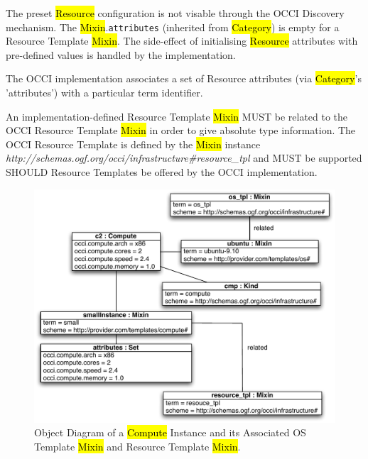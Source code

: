 \documentclass[10pt,a4paper]{article}
\begin{document}
The preset \hl{Resource} configuration is not visable through the OCCI
Discovery mechanism. The \hl{Mixin}.{\tt attributes} (inherited from
\hl{Category}) is empty for a Resource Template \hl{Mixin}.  The
side-effect of initialising \hl{Resource} attributes with pre-defined
values is handled by the implementation.

The OCCI implementation associates a set of Resource attributes (via
\hl{Category}'s 'attributes') with a particular term identifier.

An implementation-defined Resource Template \hl{Mixin} MUST be related
to the OCCI Resource Template \hl{Mixin} in order to give absolute
type information. The OCCI Resource Template is defined by the
\hl{Mixin} instance
\textit{http://schemas.ogf.org/occi/infrastructure\#resource\_tpl} and
MUST be supported SHOULD Resource Templates be offered by the OCCI
implementation.

\begin{figure}[!h]
	\centering
	\includegraphics[scale=0.5]{figs/infra_template_obj_diag2}
	\caption{Object Diagram of a \hl{Compute} Instance and its Associated OS Template 
	\hl{Mixin} and Resource Template \hl{Mixin}.}
	\label{fig:infra_template_obj_diag2}
\end{figure}

\end{document}
